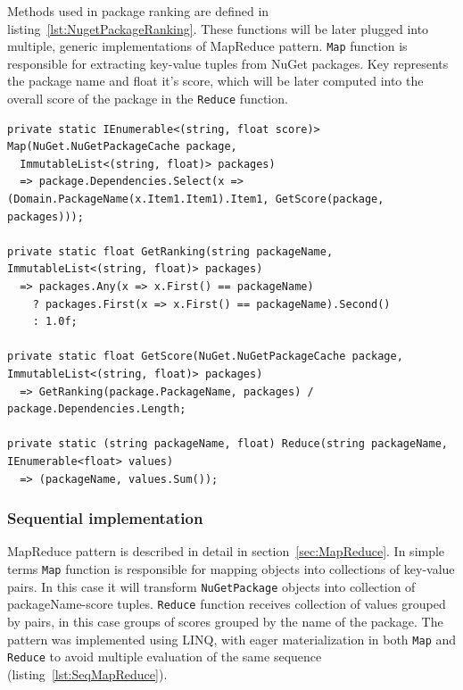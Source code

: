Methods used in package ranking are defined in listing~\ref{lst:NugetPackageRanking}. These functions will be later plugged into multiple, generic implementations of MapReduce pattern. \texttt{Map} function is responsible for extracting key-value tuples from NuGet packages. Key represents the package name and float it's score, which will be later computed into the overall score of the package in the \texttt{Reduce} function.

\begin{lstlisting}[language={[sharp]c}, style=sharpcstyle, caption={Nuget package ranking functions}, label={lst:NugetPackageRanking},
numbers=none, xleftmargin=0pt,framexleftmargin=0pt,framexrightmargin=0pt,framexbottommargin=0pt]
private static IEnumerable<(string, float score)> Map(NuGet.NuGetPackageCache package,
  ImmutableList<(string, float)> packages)
  => package.Dependencies.Select(x => (Domain.PackageName(x.Item1.Item1).Item1, GetScore(package, packages)));

private static float GetRanking(string packageName, ImmutableList<(string, float)> packages)
  => packages.Any(x => x.First() == packageName)
    ? packages.First(x => x.First() == packageName).Second()
    : 1.0f;

private static float GetScore(NuGet.NuGetPackageCache package, ImmutableList<(string, float)> packages)
  => GetRanking(package.PackageName, packages) / package.Dependencies.Length;

private static (string packageName, float) Reduce(string packageName, IEnumerable<float> values)
  => (packageName, values.Sum());
\end{lstlisting}

\subsubsection{Sequential implementation}
MapReduce pattern is described in detail in section~\ref{sec:MapReduce}. 
In simple terms \texttt{Map} function is responsible for mapping objects into collections of key-value pairs. In this case it will transform \texttt{NuGetPackage} objects into collection of packageName-score tuples.  \texttt{Reduce} function receives collection of values grouped by pairs, in this case groups of scores grouped by the name of the package. The pattern was implemented using LINQ, with eager materialization in both \texttt{Map} and  \texttt{Reduce} to avoid multiple evaluation of the same sequence (listing~\ref{lst:SeqMapReduce}).

